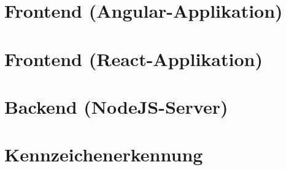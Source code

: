 \section{Frontend (Angular-Applikation)}

\section{Frontend (React-Applikation)}

\section{Backend (NodeJS-Server)}

\section{Kennzeichenerkennung}

